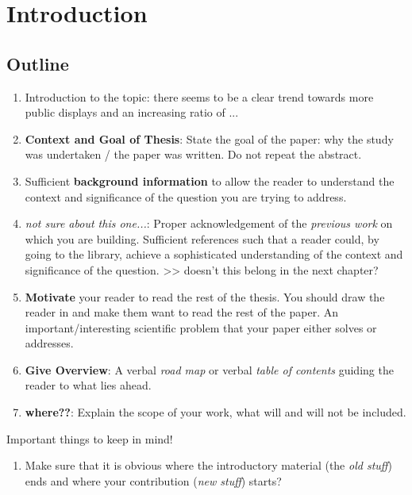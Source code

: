 \section{Introduction}
\label{sec:introduction}


\subsection{Outline}

  
	\begin{enumerate}

	\item Introduction to the topic: there seems to be a clear trend towards more public displays and an increasing ratio of ...

	\item \textbf{Context and Goal of Thesis}: State the goal of the paper: why the study was undertaken / the paper was written. Do not repeat the abstract. 

	\item Sufficient \textbf{background information} to allow the reader to understand the context and significance of the question you are trying to address. 

	\item \textit{not sure about this one...}: Proper acknowledgement of the \textit{previous work} on which you are building. Sufficient references such that a reader could, by going to the library, achieve a sophisticated understanding of the context and significance of the question.  >> doesn't this belong in the next chapter?


	\item \textbf{Motivate} your reader to read the rest of the thesis. You should draw the reader in and make them want to read the rest of the paper. An important/interesting scientific problem that your paper either solves or addresses.

	\item \textbf{Give Overview}: A verbal \textit{road map} or verbal \textit{table of contents} guiding the reader to what lies ahead. 

	\item \textbf{where??}: Explain the scope of your work, what will and will not be included. 
	\end{enumerate}




Important things to keep in mind!

  \begin{enumerate}
  \item Make sure that it is obvious where the introductory material (the \textit{old stuff}) ends and where your contribution (\textit{new stuff}) starts?
  \end{enumerate}






